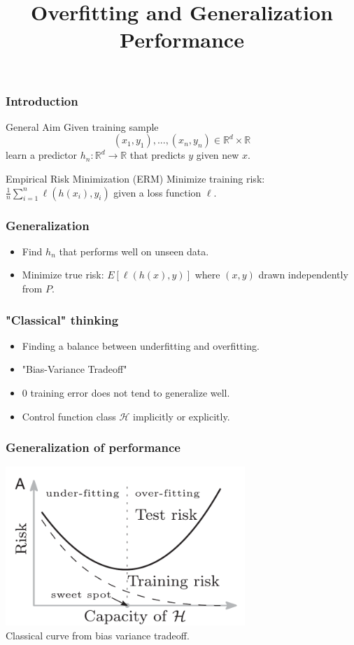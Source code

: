 \documentclass{beamer}
\title[About Beamer] %
{Overfitting and Generalization Performance}
\begin{document}
	
\frame{\titlepage}
	
\begin{frame}
\frametitle{Introduction}
	
	\begin{block}{General Aim}
		Given training sample \[(x_1, y_1), ..., (x_n, y_n) \in \mathbb{R}^d \times \mathbb{R}\]
		learn a predictor 
		$h_n : \mathbb{R}^d \to \mathbb{R}$ that predicts $y$ given new $x$.
	\end{block}
	
	\begin{block}{Empirical Risk Minimization (ERM)}
		Minimize training risk:
		$\frac{1}{n} \sum_{i=1}^{n}\ell(h(x_i), y_i) $
		given a loss function $\ell$.
	\end{block}

\end{frame}

\begin{frame}
\frametitle{Generalization}

\begin{itemize}[itemsep = 12pt]
	\item Find $h_n$ that performs well on unseen data.
	\item Minimize true risk: $E[\ell (h(x), y)]$
where  $(x, y)$ drawn independently from $P$.
\end{itemize}

\end{frame}

\begin{frame}
\frametitle{"Classical" thinking}
\begin{itemize}[itemsep = 12pt]
	\item Finding a balance between underfitting and overfitting.
	\item "Bias-Variance Tradeoff"
	\item 0 training error does not tend to generalize well.
	\item Control function class $\mathcal{H}$ implicitly or explicitly.
\end{itemize}
\end{frame}


\begin{frame}
\frametitle{Generalization of performance}
\includegraphics[height=6cm]{UCurve.png}
\\Classical curve from bias variance tradeoff.
\end{frame}
\end{document}
